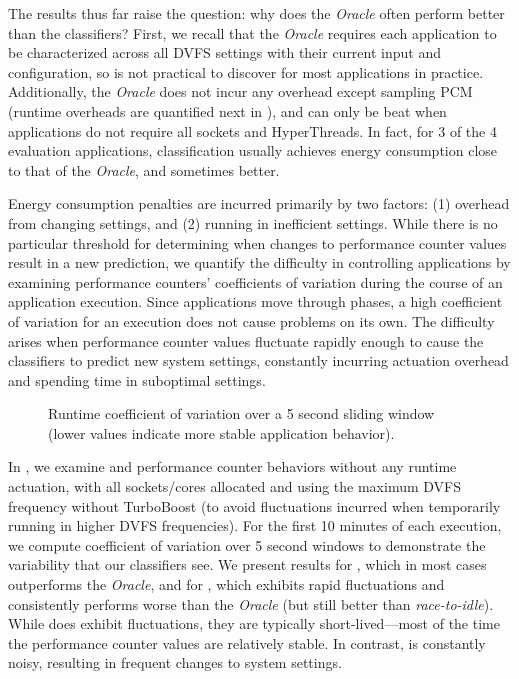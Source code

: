 The results thus far raise the question: why does the \emph{Oracle} often perform better than the classifiers?
First, we recall that the \emph{Oracle} requires each application to be characterized across all DVFS settings with their current input and configuration, so is not practical to discover for most applications in practice.
Additionally, the \emph{Oracle} does not incur any overhead except sampling PCM (runtime overheads are quantified next in ), and can only be beat when applications do not require all sockets and HyperThreads.
In fact, for 3 of the 4 evaluation applications, classification usually achieves energy consumption close to that of the \emph{Oracle}, and sometimes better.

Energy consumption penalties are incurred primarily by two factors: (1) overhead from changing settings, and (2) running in inefficient settings.
While there is no particular threshold for determining when changes to performance counter values result in a new prediction, we quantify the difficulty in controlling applications by examining performance counters' coefficients of variation during the course of an application execution.
Since applications move through phases, a high coefficient of variation for an execution does not cause problems on its own.
The difficulty arises when performance counter values fluctuate rapidly enough to cause the classifiers to predict new system settings, constantly incurring actuation overhead and spending time in suboptimal settings.

\begin{figure}[t]
  \centering
  
  \caption{Runtime coefficient of variation over a 5 second sliding window (lower values indicate more stable application behavior).}
  \label{fig:cv}
\end{figure}

In , we examine  and  performance counter behaviors without any runtime actuation, with all sockets/cores allocated and using the maximum DVFS frequency without TurboBoost (to avoid fluctuations incurred when temporarily running in higher DVFS frequencies).
For the first 10 minutes of each execution, we compute coefficient of variation over 5 second windows to demonstrate the variability that our classifiers see.
We present results for , which in most cases outperforms the \emph{Oracle}, and for , which exhibits rapid fluctuations and consistently performs worse than the \emph{Oracle} (but still better than \emph{race-to-idle}).
While  does exhibit fluctuations, they are typically short-lived---most of the time the performance counter values are relatively stable.
In contrast,  is constantly noisy, resulting in frequent changes to system settings.

